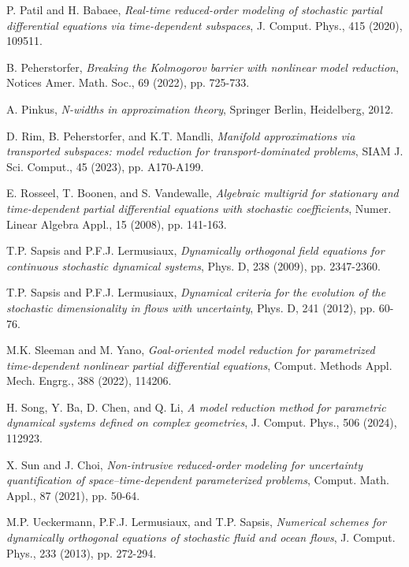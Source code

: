 \documentclass[10pt,a4paper]{article}
\numberwithin{equation}{section}
\numberwithin{lemma}{section}
\numberwithin{example}{section}
\numberwithin{definition}{section}
\numberwithin{assumption}{section}
\numberwithin{theorem}{section}
\numberwithin{proposition}{section}
\numberwithin{corollary}{section}
\numberwithin{remark}{section}
\begin{document}
\begin{thebibliography}{}
   
    {\sc P. Patil and H. Babaee}, {\em Real-time reduced-order modeling of stochastic partial differential equations via time-dependent subspaces}, J. Comput. Phys., 415 (2020), 109511.

    {\sc B. Peherstorfer}, {\em Breaking the Kolmogorov barrier with nonlinear model reduction}, Notices Amer. Math. Soc., 69 (2022), pp. 725-733.


    {\sc A. Pinkus}, {\em N-widths in approximation theory}, Springer Berlin, Heidelberg, 2012.


    {\sc D. Rim, B. Peherstorfer, and K.T. Mandli}, {\em Manifold approximations via transported subspaces: model reduction for transport-dominated problems}, SIAM J. Sci. Comput., 45 (2023), pp. A170-A199.
    
    {\sc E. Rosseel, T. Boonen, and S. Vandewalle}, {\em  Algebraic multigrid for stationary and time-dependent partial differential equations with stochastic coefficients}, Numer. Linear Algebra Appl., 15 (2008), pp. 141-163.

    {\sc T.P. Sapsis and P.F.J. Lermusiaux}, {\em Dynamically orthogonal field equations for continuous stochastic dynamical systems}, Phys. D, 238 (2009), pp. 2347-2360.
    
    {\sc T.P. Sapsis and P.F.J. Lermusiaux}, {\em Dynamical criteria for the evolution of the stochastic dimensionality in flows with uncertainty}, Phys. D, 241 (2012), pp. 60-76.

    {\sc M.K. Sleeman and M. Yano}, {\em Goal-oriented model reduction for parametrized time-dependent nonlinear partial differential equations}, Comput. Methods Appl. Mech. Engrg., 388 (2022), 114206.
    
    {\sc H. Song, Y. Ba, D. Chen, and Q. Li}, {\em  A model reduction method for parametric dynamical systems defined on complex geometries}, J. Comput. Phys., 506 (2024), 112923.

    {\sc X. Sun and J. Choi}, {\em Non-intrusive reduced-order modeling for uncertainty quantification of space–time-dependent parameterized problems}, Comput. Math. Appl., 87 (2021), pp. 50-64.

    
    {\sc M.P. Ueckermann, P.F.J. Lermusiaux, and T.P. Sapsis}, {\em Numerical schemes for dynamically orthogonal equations of stochastic fluid and ocean flows}, J. Comput. Phys., 233 (2013), pp. 272-294.


\end{thebibliography}
\end{document}
